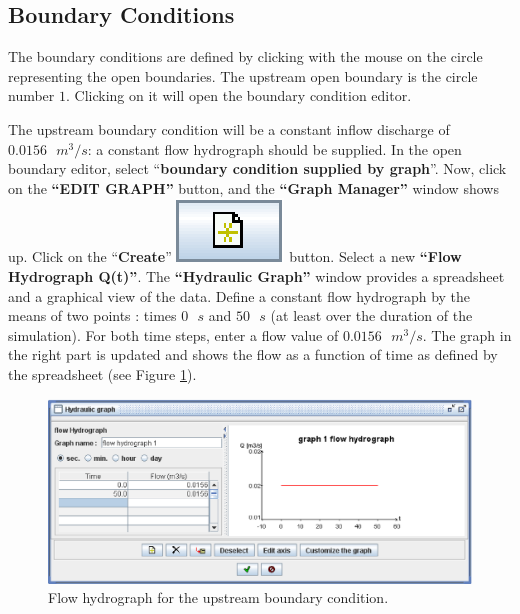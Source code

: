 \documentclass[a4paper,12pt]{article}
\begin{document}
\subsection{Boundary Conditions  }

\hspace{0.5cm}The boundary conditions are defined by clicking with the mouse on
the circle representing the open boundaries. The upstream open boundary
is the circle number $1$. Clicking on it will open the boundary condition
editor.

\vspace{0.5cm}

The upstream boundary condition will be a constant inflow discharge of $0.0156\mbox{ }m^3/s$:
a constant flow hydrograph should be supplied. In the open
boundary editor, select {}``\textbf{boundary condition supplied by
graph}''. Now, click on the \textbf{{}``EDIT GRAPH''} button, and
the \textbf{{}``Graph Manager''} window shows up. Click on the {}``\textbf{Create}''
\includegraphics[scale=0.6]{new} button. Select a new \textbf{{}``Flow Hydrograph Q(t)''}. The \textbf{{}``Hydraulic
Graph''} window provides a spreadsheet and a graphical view of the
data. Define a constant flow hydrograph by the means of two points
: times $0\mbox{ }s$ and $50\mbox{ }s$ (at least over the duration of the simulation).
For both time steps, enter a flow value of $0.0156\mbox{ }m^3/s$. The graph in
the right part is updated and shows the flow as a function of time
as defined by the spreadsheet (see Figure \ref{fig:Flow-boco1}).

\begin{figure}[h]
  \begin{center}
  \includegraphics[scale=0.5]{flow_b1}
  \caption{Flow hydrograph for the upstream boundary condition.}
  \label{fig:Flow-boco1}
  \end{center}
\end{figure}
\end{document}

